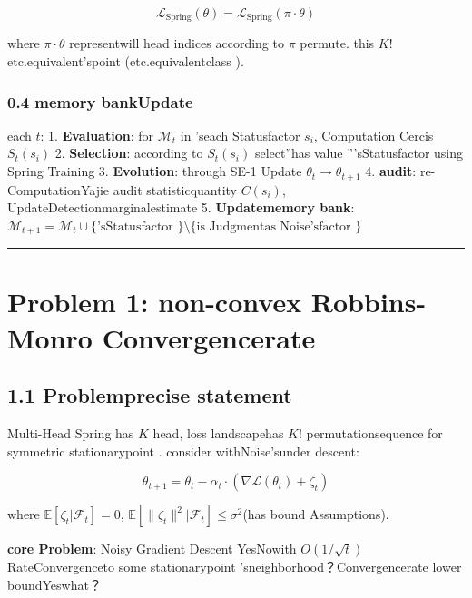 \documentclass[
  12pt,
]{article}
\begin{document}
\[\mathcal{L}_{\text{Spring}}(\theta) = \mathcal{L}_{\text{Spring}}(\pi \cdot \theta)\]

where \(\pi \cdot \theta\) representwill head indices according to \(\pi\) permute. this  \(K!\)
etc.equivalent'spoint (etc.equivalentclass ). 

\subsubsection{0.4 memory bankUpdate}\label{ux8bb0ux5fc6ux5e93ux66f4ux65b0}

each  \(t\):  1. \textbf{Evaluation}: for  \(\mathcal{M}_t\) in 'seach Statusfactor 
\(s_i\), Computation Cercis  \(S_t(s_i)\) 2. \textbf{Selection}: according to 
\(S_t(s_i)\) select''has value '''sStatusfactor using  Spring Training 3.
\textbf{Evolution}: through  SE-1 Update \(\theta_t \to \theta_{t+1}\) 4.
\textbf{audit}: re-ComputationYajie audit statisticquantity  \(C(s_i)\), UpdateDetectionmarginalestimate 5.
\textbf{Updatememory bank}: \(\mathcal{M}_{t+1} = \mathcal{M}_t \cup \{\text{'sStatusfactor }\} \setminus \{\text{is Judgmentas Noise'sfactor }\}\)

\begin{center}\rule{0.5\linewidth}{0.5pt}\end{center}

\section{Problem 1: non-convex Robbins-Monro
Convergencerate }\label{ux95eeux9898-1ux975eux51f8-robbins-monro-ux6536ux655bux7387}

\subsection{1.1
Problemprecise statement}\label{ux95eeux9898ux7cbeux786eux9648ux8ff0}

Multi-Head Spring has  \(K\) head, loss landscapehas  \(K!\)
permutationsequence for symmetric stationarypoint . consider withNoise'sunder descent: 

\[\theta_{t+1} = \theta_t - \alpha_t \cdot (\nabla \mathcal{L}(\theta_t) + \zeta_t)\]

where
\(\mathbb{E}[\zeta_t | \mathcal{F}_t] = 0\), \(\mathbb{E}[\|\zeta_t\|^2 | \mathcal{F}_t] \leq \sigma^2\)(has bound Assumptions). 

\textbf{core Problem}: Noisy Gradient Descent YesNowith  \(O(1/\sqrt{t})\)
RateConvergenceto some stationarypoint 'sneighborhood？Convergencerate lower boundYeswhat？
\end{document}
